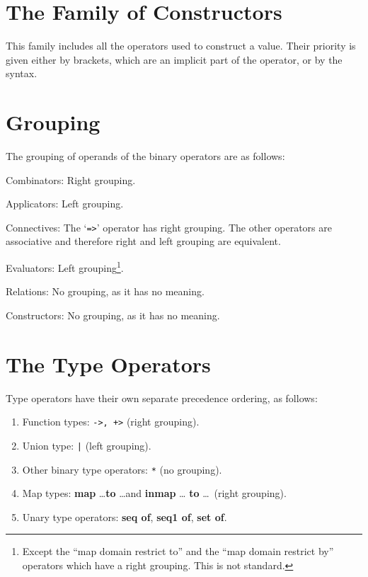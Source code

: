 \documentclass{overturerepchap}
\newcommand{\nonstandard}[1]{}
\newcommand{\keyw}[1]{{\bf\ttfamily #1}}
\begin{document}
\section{The Family of Constructors}

This family includes all the operators used to construct a value.  Their
priority is given either by brackets, which are an implicit part of the
operator, or by the syntax.

\section{Grouping}\label{grouping}

The grouping of operands of the binary operators are as follows:

\begin{list}{\bf no label!}{%
    \def\mylabel#1{\hspace\labelsep #1\hfill}
    \let\makelabel\mylabel
    \settowidth{\labelwidth}{Constructors: }
    \setlength{\leftmargin}{\labelwidth}
    \addtolength{\leftmargin}{2\labelsep}
    }
\item[Combinators:] Right grouping.

\item[Applicators:] Left grouping.

\item[Connectives:] The `{\tt =>}' operator has right grouping.  The other
  operators are associative and therefore right and left grouping are
  equivalent.
  
\item[Evaluators:] Left grouping\footnote{Except the ``map domain restrict
    to'' and the ``map domain restrict by'' operators which have a right
    grouping. This is not standard.}.

\item[Relations:] No grouping, as it has no meaning.

\item[Constructors:] No grouping, as it has no meaning.
\end{list}

\section{The Type Operators}\label{preceedence}

Type operators have their own separate precedence ordering, as follows:
\begin{enumerate}
\item Function types: {\tt ->, +>} (right grouping).

\item Union type: {\tt |} (left grouping).

\item Other binary type operators: \verb+*+ (no grouping).

\item Map types: \keyw{map} \ldots \keyw{to} \ldots and \keyw{inmap} \ldots
  \keyw{to} \ldots\ (right grouping).\nonstandard{0}

\item Unary type operators: \keyw{seq of}, \keyw{seq1 of}, \keyw{set of}.
\end{enumerate}
\end{document}
